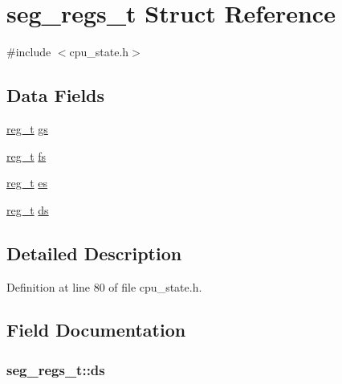 \hypertarget{structseg__regs__t}{\section{seg\-\_\-regs\-\_\-t \-Struct \-Reference}
\label{structseg__regs__t}
}


{\ttfamily \#include $<$cpu\-\_\-state.\-h$>$}

\subsection*{\-Data \-Fields}
\begin{DoxyCompactItemize}
\item 
\hyperlink{types_8h_a089269ab3c13f602c75d4c7820175d67}{reg\-\_\-t} \hyperlink{structseg__regs__t_af3c39996499f1c4885ce96121f2fdde7}{gs}
\item 
\hyperlink{types_8h_a089269ab3c13f602c75d4c7820175d67}{reg\-\_\-t} \hyperlink{structseg__regs__t_a49bcd2ca05a6613d1ed6ff1c1b062940}{fs}
\item 
\hyperlink{types_8h_a089269ab3c13f602c75d4c7820175d67}{reg\-\_\-t} \hyperlink{structseg__regs__t_a2cba36244f3431cf78336175e73e9244}{es}
\item 
\hyperlink{types_8h_a089269ab3c13f602c75d4c7820175d67}{reg\-\_\-t} \hyperlink{structseg__regs__t_ade33634359bc73e66892961923388104}{ds}
\end{DoxyCompactItemize}


\subsection{\-Detailed \-Description}


\-Definition at line 80 of file cpu\-\_\-state.\-h.



\subsection{\-Field \-Documentation}
\hypertarget{structseg__regs__t_ade33634359bc73e66892961923388104}{
\subsubsection[{ds}]{ {\bf seg\-\_\-regs\-\_\-t\-::ds}}}\label{structseg__regs__t_ade33634359bc73e66892961923388104}


